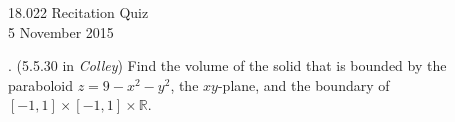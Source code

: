 \documentclass[11pt]{article}
\newcommand{\R}{\mathbb{R}}
\newcounter{prob}
\newcounter{subprob}
\newcommand\itm{\theprob.  \stepcounter{prob}\setcounter{subprob}{1}}
\newcommand\sol[2]{\iftoggle{solutions}{\begin{proof}[Solution] #1\end{proof}}{#2}}
\begin{document}
\thispagestyle{empty}

\begin{center}
  18.022 Recitation Quiz \iftoggle{solutions}{(with solutions)}{} \\
  5 November 2015 
\end{center}

\itm (5.5.30 in \textit{Colley}) Find the volume of the solid that is bounded by the paraboloid $z = 9 - x^2 - y^2$, the $xy$-plane, and the boundary of $[-1,1]\times[-1,1]\times \R$. 

\sol{
  To find the volume of the region, we integrate 1 over the region. We calculate 
\begin{align*}
  \text{volume} &= \int_{-1}^{1}\int_{-1}^{1}\int_{0}^{9-x^2-y^2}1\,dz\,dy\,dx \\
  &= \int_{-1}^{1}\int_{-1}^{1}9-x^2-y^2\,dy\,dx \\
  &= \int_{-1}^{1}[9y-x^2y-y^3/3]_{-1}^{1}\,dx = \boxed{100/3}. \qedhere
\end{align*}
}{\vfill}
\end{document}
